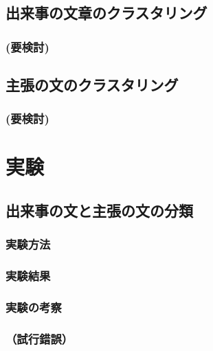 \documentclass[12pt,a4j]{jreport}
\begin{document}
\section{出来事の文章のクラスタリング}
    \subsection{(要検討)}
\section{主張の文のクラスタリング}
    \subsection{(要検討)}



\chapter{実験}

\section{出来事の文と主張の文の分類}
    \subsection{実験方法}
    \subsection{実験結果}
    \subsection{実験の考察}
    \subsection{（試行錯誤）}
\end{document}

